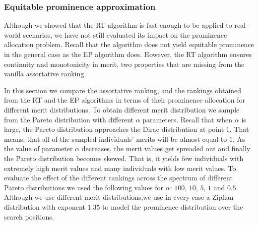 \subsubsection{Equitable prominence approximation}
\label{sec:expr-approximation}
Although we showed that the RT algorithm is fast enough to be applied
to real-world scenarios, we have not still evaluated its impact on the
prominence allocation problem. Recall that the algorithm does not
yield equitable prominence in the general case as the EP algorithm
does. However, the RT algorithm ensures continuity and monotonicity in
merit, two properties that are missing from the vanilla assortative
ranking.

In this section we compare the assortative ranking, and the rankings
obtained from the RT and the EP algorithms in terms of their
prominence allocation for different merit distributions. To obtain
different merit distribution we sample from the Pareto distribution
with different $\alpha$ parameters. Recall that when $\alpha$ is
large, the Pareto distribution approaches the Dirac distribution at
point $1$. That means, that all of the sampled individuals' merits
will be almost equal to $1$. As the value of parameter $\alpha$
decreases, the merit values get spreaded out and finally the Pareto
distribution becomes skewed. That is, it yields few individuals with
extremely high merit values and many individuals with low merit
values. To evaluate the effect of the different rankings across the
spectrum of different Pareto distributions we used the following
values for $\alpha$: $100$, $10$, $5$, $1$ and $0.5$. Although
we use different merit distributions,we use in every case a Zipfian
distribution with exponent $1.35$ to model the prominence distribution
over the search positions.

